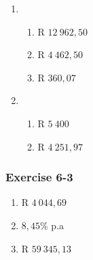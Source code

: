 {\begin{multicols}{3}
\begin{enumerate}[label=\textbf{\arabic*}.]
	\item %
	\begin{enumerate}[noitemsep, label=\textbf{(\alph*)} ]
	    \item R $12~962,50$%
	    \item R $4~ 462,50$ %
	    \item R $360,07$%
	\end{enumerate}

	\item %
	\begin{enumerate}[noitemsep, label=\textbf{(\alph*)} ]
	    \item R $5~ 400$%
	    \item R $4 ~251,97$%
	\end{enumerate}
    \end{enumerate}

\subsubsection*{Exercise 6-3} %

    \begin{enumerate}[label=\textbf{\arabic*}.]
	\item R $4 ~044,69$%

	\item $8,45\%$ p.a%

	\item R $59 ~345,13$%
    \end{enumerate}



\end{multicols}}
